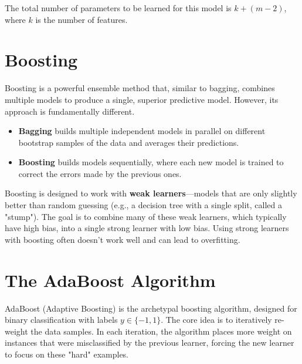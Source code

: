 \documentclass{article}
\begin{document}
\begin{multicols}{2}
The total number of parameters to be learned for this model is $k + (m-2)$, where $k$ is the number of features.

\section{Boosting}
Boosting is a powerful ensemble method that, similar to bagging, combines multiple models to produce a single, superior predictive model. However, its approach is fundamentally different.

\begin{itemize}
    \item \textbf{Bagging} builds multiple independent models in parallel on different bootstrap samples of the data and averages their predictions.
    \item \textbf{Boosting} builds models sequentially, where each new model is trained to correct the errors made by the previous ones.
\end{itemize}
Boosting is designed to work with \textbf{weak learners}—models that are only slightly better than random guessing (e.g., a decision tree with a single split, called a "stump"). The goal is to combine many of these weak learners, which typically have high bias, into a single strong learner with low bias. Using strong learners with boosting often doesn't work well and can lead to overfitting.

\section{The AdaBoost Algorithm}
AdaBoost (Adaptive Boosting) is the archetypal boosting algorithm, designed for binary classification with labels $y \in \{-1, 1\}$.
The core idea is to iteratively re-weight the data samples. In each iteration, the algorithm places more weight on instances that were misclassified by the previous learner, forcing the new learner to focus on these "hard" examples.


\end{multicols}
\end{document}
